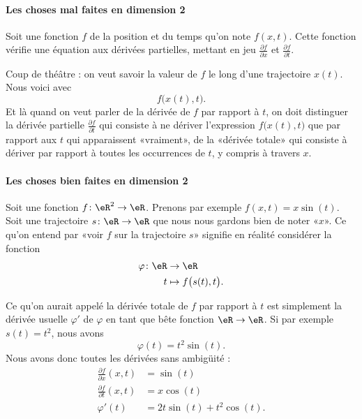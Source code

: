 \paragraph{Les choses mal faites en dimension 2}

Soit une fonction \( f\) de la position et du temps qu'on note \( f(x,t)\). Cette fonction vérifie une équation aux dérivées partielles, mettant en jeu \( \frac{ \partial f }{ \partial x }\) et \( \frac{ \partial f }{ \partial t }\).

Coup de théâtre : on veut savoir la valeur de \( f\) le long d'une trajectoire \( x(t)\). Nous voici avec
\begin{equation}
	f\big( x(t), t \big).
\end{equation}
Et là quand on veut parler de la dérivée de \( f\) par rapport à \( t\), on doit distinguer la dérivée partielle \( \frac{ \partial f }{ \partial t }\) qui consiste à ne dériver l'expression \( f\big( x(t),t \big)\) que par rapport aux \( t\) qui apparaissent «vraiment», de la «dérivée totale» qui consiste à dériver par rapport à toutes les occurrences de \( t\), y compris à travers \( x\).

\paragraph{Les choses bien faites en dimension 2}

Soit une fonction \( f\colon \eR^2\to \eR\). Prenons par exemple \( f(x,t)=x\sin(t)\). Soit une trajectoire \( s\colon \eR\to \eR\) que nous nous gardons bien de noter «\( x\)». Ce qu'on entend par «voir \( f\) sur la trajectoire \( s\)»  signifie en réalité considérer la fonction
\begin{equation}
	\begin{aligned}
		\varphi\colon \eR & \to \eR                       \\
		t                 & \mapsto f\big( s(t), t \big).
	\end{aligned}
\end{equation}

Ce qu'on aurait appelé la dérivée totale de \( f\) par rapport à \( t\) est simplement la dérivée usuelle \( \varphi'\) de \( \varphi\) en tant que bête fonction \( \eR\to \eR\). Si par exemple \( s(t)=t^2\), nous avons
\begin{equation}
	\varphi(t)=t^2\sin(t).
\end{equation}
Nous avons donc toutes les dérivées sans ambigüité :
\begin{subequations}
	\begin{align}
		\frac{ \partial f }{ \partial x }(x,t) & =\sin(t)               \\
		\frac{ \partial f }{ \partial t }(x,t) & =x\cos(t)              \\
		\varphi'(t)                            & =2t\sin(t)+t^2\cos(t).
	\end{align}
\end{subequations}

